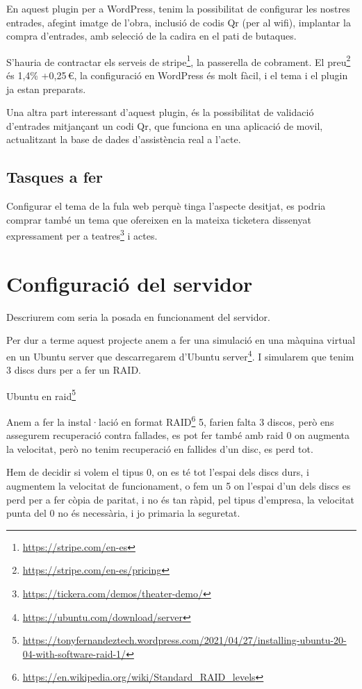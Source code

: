 \documentclass[
  10pt,
]{krantz}
\DeclareRobustCommand{\href}[2]{#2\footnote{\url{#1}}}
\begin{document}
En aquest plugin per a WordPress, tenim la possibilitat de configurar les nostres entrades, afegint imatge de l'obra, inclusió de codis Qr (per al wifi), implantar la compra d'entrades, amb selecció de la cadira en el pati de butaques.

S'hauria de contractar els serveis de \href{https://stripe.com/en-es}{stripe}, la passerella de cobrament. El \href{https://stripe.com/en-es/pricing}{preu} és 1,4\% +0,25\,€, la configuració en WordPress és molt fàcil, i el tema i el plugin ja estan preparats.

Una altra part interessant d'aquest plugin, és la possibilitat de validació d'entrades mitjançant un codi Qr, que funciona en una aplicació de movil, actualitzant la base de dades d'assistència real a l'acte.

\hypertarget{tasques-a-fer}{%
\section{Tasques a fer}\label{tasques-a-fer}}

Configurar el tema de la fula web perquè tinga l'aspecte desitjat, es podria comprar també un tema que ofereixen en la mateixa ticketera dissenyat expressament per a \href{https://tickera.com/demos/theater-demo/}{teatres} i actes.

\hypertarget{configuraciuxf3-del-servidor}{%
\chapter{Configuració del servidor}\label{configuraciuxf3-del-servidor}}

Descriurem com seria la posada en funcionament del servidor.

Per dur a terme aquest projecte anem a fer una simulació en una màquina virtual en un Ubuntu server que descarregarem \href{https://ubuntu.com/download/server}{d'Ubuntu server}. I simularem que tenim 3 discs durs per a fer un RAID.

\href{https://tonyfernandeztech.wordpress.com/2021/04/27/installing-ubuntu-20-04-with-software-raid-1/}{Ubuntu en raid}

Anem a fer la instal·lació en format \href{https://en.wikipedia.org/wiki/Standard_RAID_levels}{RAID} 5, farien falta 3 discos, però ens assegurem recuperació contra fallades, es pot fer també amb raid 0 on augmenta la velocitat, però no tenim recuperació en fallides d'un disc, es perd tot.

Hem de decidir si volem el tipus 0, on es té tot l'espai dels discs durs, i augmentem la velocitat de funcionament, o fem un 5 on l'espai d'un dels discs es perd per a fer còpia de paritat, i no és tan ràpid, pel tipus d'empresa, la velocitat punta del 0 no és necessària, i jo primaria la seguretat.
\end{document}
